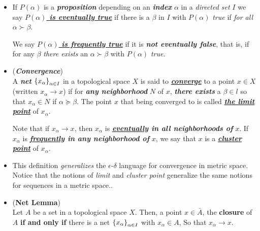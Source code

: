 \documentclass[11pt]{article}
\begin{document}
\begin{itemize}
\item \begin{definition}
If $P(\alpha)$ is a \emph{\textbf{proposition}} depending on an \emph{\textbf{index}} $\alpha$ in a \emph{directed set} $I$ we say \underline{\emph{\textbf{$P(\alpha)$ is eventually true}}} if there is a $\beta$ in $I$ with $P(\alpha)$ \emph{true} if \emph{for all} $\alpha \succ \beta$. 

We say \underline{\emph{\textbf{$P(\alpha)$ is frequently true}}} if it is \emph{\textbf{not eventually false}}, that is, if for any $\beta$ \emph{there exists} an $\alpha \succ \beta$ with $P(\alpha)$ \emph{true}.
\end{definition}

\item \begin{definition} (\emph{\textbf{Convergence}})\\
A \emph{\textbf{net}} $\left\{x_\alpha\right\}_{\alpha \in I}$  in a topological space $X$ is said to \underline{\emph{\textbf{converge}}} to a point $x \in X$ (written $x_{\alpha} \rightarrow x$) if for \textbf{\emph{any neighborhood}} $N$ of $x$, \emph{\textbf{there exists}} a $\beta \in l$ so that $x_{\alpha} \in N$ if $\alpha \succeq \beta$. The point $x$ that being converged to is called \underline{\emph{\textbf{the limit point}}} of  $x_{\alpha}$.

Note that if $x_\alpha \rightarrow x$, then $x_{\alpha}$ is \emph{\textbf{\underline{eventually} in all neighborhoods of}} $x$. If $x_{\alpha}$ is \emph{\textbf{\underline{frequently} in any neighborhood of}} $x$, we say that $x$ is a \underline{\emph{\textbf{cluster point}}} of $x_{\alpha}$. 
\end{definition}


\item \begin{remark}
This definition \emph{generalizes} the $\epsilon$-$\delta$ language for convergence in metric space.  Notice that the notions of \emph{limit} and \emph{cluster point} generalize the same notions for sequences in a metric space..
\end{remark} 

\item \begin{proposition} (\textbf{Net Lemma}) \citep{reed1980methods}\\
Let $A$ be a set in a topological space $X$. Then, a point $x \in \bar{A}$, the \textbf{closure} of $A$ \textbf{if and only if} there is a net $\left\{x_\alpha\right\}_{\alpha \in I}$ with $x_{\alpha} \in A$, So that $x_{\alpha} \rightarrow x$.
\end{proposition}


\end{itemize}
\end{document}
